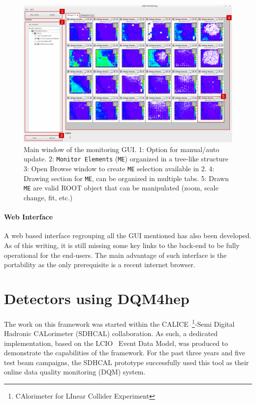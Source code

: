 \documentclass{webofc}
\begin{document}
\begin{figure}
  \centering
  \includegraphics[width=.95\textwidth]{figs/MaintInterfaceGUI.pdf}
    \caption{\label{fig:DQMMainViz} Main window of the monitoring GUI.
    1: Option for manual/auto update.
    2: \texttt{Monitor Elements} (\texttt{ME}) organized in a tree-like structure
    3: Open Browse window to create \texttt{ME} selection available in 2.
    4: Drawing section for \texttt{ME}, can be organized in multiple tabs.
    5: Drawn \texttt{ME} are valid ROOT object that can be manipulated (zoom, scale change, fit, etc.)
    }
\end{figure}

\paragraph{Web Interface}\label{par:WebGUI}
A web based interface regrouping all the GUI mentioned has also been developed. As of this writing, it is still missing some key links to the back-end to be fully operational for the end-users. The main advantage of such interface is the portability as the only prerequisite is a recent internet browser.

\section{Detectors using DQM4hep}
\label{sec:detectors}

The work on this framework was started within the CALICE~\footnote{CAlorimeter for LInear Collider Experiment}-Semi Digital Hadronic CALorimeter (SDHCAL) collaboration.
As such, a dedicated implementation, based on the LCIO~\cite{LCIO} Event Data Model, was produced to demonstrate the capabilities of the framework.
For the past three years and five test beam campaigns, the SDHCAL prototype successfully used this tool as their online data quality monitoring (DQM) system.
\end{document}
